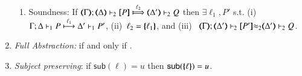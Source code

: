 \begin{definition}
\begin{enumerate}[1.]
\begin{enumerate}
			\item	Soundness:   
				If  $\wtytraarg{\mapt{\Gamma}}{\ell_2}{\mapt{\Delta}}{\map{P}}{\mapt{\Delta'}}{Q}{2}$
				then $\exists \ell_1, P'$ s.t.  
				(i)~$\stytraarg{\Gamma}{\ell_1}{\Delta}{P}{\Delta'}{P'}{1}$,
				(ii)~$\ell_2 = \mapa{\ell_1}$, and
				(iii)~
${\mapt{\Gamma}};{\mapt{\Delta'}}\proves_2 {\map{P'}}{\wb_2}
{\mapt{\Delta'}}\proves_2 {Q}$.

		\end{enumerate}
		
		\item \emph{Full Abstraction:} 
		if and only if
		.
		
		\item \emph{Subject preserving}: if $\mathsf{sub}(\ell) = u$ then $\mathsf{sub}(\mapa{\ell}) =u$.
	\end{enumerate}
\end{definition}

